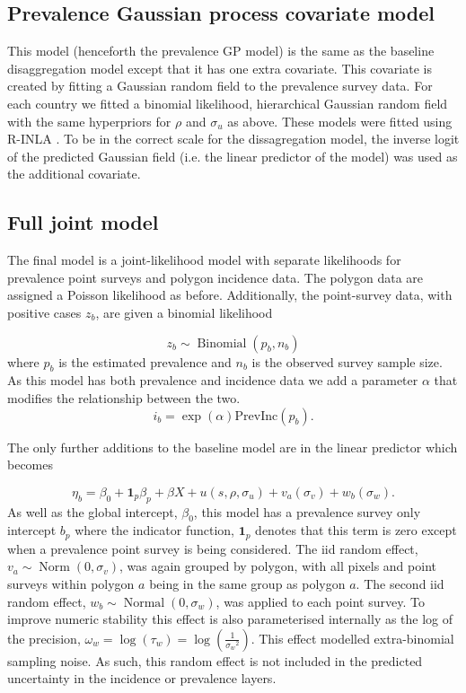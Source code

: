 \documentclass{statsoc}
\begin{document}
\subsection*{Prevalence Gaussian process covariate model}

This model (henceforth the prevalence GP model) is the same as the baseline disaggregation model except that it has one extra covariate.
This covariate is created by fitting a Gaussian random field to the prevalence survey data.
For each country we fitted a binomial likelihood, hierarchical Gaussian random field with the same hyperpriors for $\rho$ and $\sigma_u$ as above.
These models were fitted using R-INLA \citep{INLA}.
To be in the correct scale for the dissagregation model, the inverse logit of the predicted Gaussian field (i.e. the linear predictor of the model) was used as the additional covariate.

\subsection*{Full joint model}

The final model is a joint-likelihood model with separate likelihoods for prevalence point surveys and polygon incidence data.
The polygon data are assigned a Poisson likelihood as before.
Additionally, the point-survey data, with positive cases $z_b$, are given a binomial likelihood

$$z_b \sim \operatorname{Binomial}(p_b, n_b) $$
where $p_b$ is the estimated prevalence and $n_b$ is the observed survey sample size. 
As this model has both prevalence and incidence data we add a parameter $\alpha$ that modifies the relationship between the two.
$$i_b = \exp(\alpha)\mathrm{PrevInc}(p_b).$$

The only further additions to the baseline model are in the linear predictor which becomes 

$$\eta_b = \beta_0 + \mathbf{1}_p\beta_p +  \beta X  + u(s, \rho, \sigma_u) + v_a(\sigma_v) + w_b(\sigma_w).$$
As well as the global intercept, $\beta_0$, this model has a prevalence survey only intercept $b_p$ where the indicator function, $\mathbf{1}_p$ denotes that this term is zero except when a prevalence point survey is being considered.
The iid random effect, $v_a \sim \operatorname{Norm}(0, \sigma_v)$, was again grouped by polygon, with all pixels and point surveys within polygon $a$ being in the same group as polygon $a$.
The second iid random effect, $w_b \sim \operatorname{Normal}(0, \sigma_w)$, was applied to each point survey.
To improve numeric stability this effect is also parameterised internally as the log of the precision, $\omega_w = \log(\tau_w) = \log(\frac{1}{{\sigma_w}^2})$.
This effect modelled extra-binomial sampling noise.
As such, this random effect is not included in the predicted uncertainty in the incidence or prevalence layers.
\end{document}
